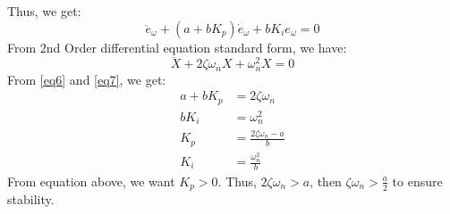 \documentclass[12pt,a4paper]{article}
\begin{document}
	Thus, we get:
	\begin{equation}
		\label{eq6}
		\ddot{e}_{\omega} + (a + bK_p)\dot{e}_{\omega} + bK_ie_{\omega} = 0
	\end{equation}
	From 2nd Order differential equation standard form, we have:
	\begin{equation}
		\label{eq7}
		\ddot{X} + 2\zeta\omega_nX+\omega_n^2X = 0
	\end{equation}
	From \autoref{eq6} and \autoref{eq7}, we get:
	\[
	\begin{split}
		a + bK_p &= 2\zeta\omega_n \\
		bK_i     &= \omega_n^2 \\
		K_p      &= \frac{2\zeta\omega_n - a}{b} \\
		K_i      &= \frac{\omega_n^2}{b}
	\end{split}
	\]
	From equation above, we want \(K_p > 0\). Thus, \(2\zeta\omega_n > a\), then \(\zeta\omega_n > \frac{a}{2}\) to ensure stability.
	
	
\end{document}
